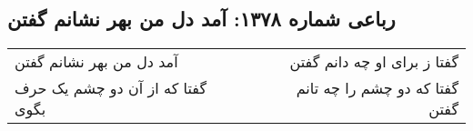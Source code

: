 \begin{center}
\section*{رباعی شماره ۱۳۷۸: آمد دل من بهر نشانم گفتن}
\label{sec:1378}
\begin{longtable}{l p{0.5cm} r}
آمد دل من بهر نشانم گفتن
&&
گفتا ز برای او چه دانم گفتن
\\
گفتا که از آن دو چشم یک حرف بگوی
&&
گفتا که دو چشم را چه تانم گفتن
\\
\end{longtable}
\end{center}

